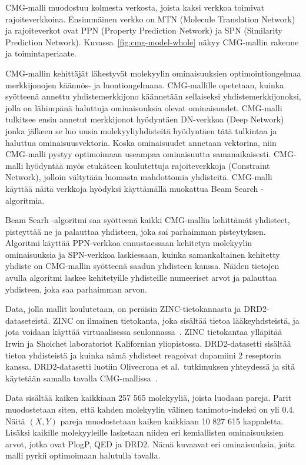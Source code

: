 \documentclass[finnish,twoside,censored,tkt,sw-line]{HYthesisML}
\begin{document}
CMG-malli muodostuu kolmesta verkosta, joista kaksi verkkoa toimivat rajoiteverkkoina.
Ensimmäinen verkko on MTN (Molecule Translation Network) ja rajoiteverkot ovat PPN (Property Prediction Network) ja SPN (Similarity Prediction Network).
Kuvassa~\ref{fig:cmg-model-whole} näkyy CMG-mallin rakenne ja toimintaperiaate.

CMG-mallin kehittäjät lähestyvät molekyylin ominaisuuksien optimointiongelmaa merkkijonojen käännös- ja luontiongelmana.
CMG-mallille opetetaan, kuinka syötteenä annettu yhdistemerkkijono käännetään sellaiseksi yhdistemerkkijonoksi, jolla on lähimpänä haluttuja ominaisuuksia olevat ominaisuudet.
CMG-malli tulkitsee ensin annetut merkkijonot hyödyntäen DN-verkkoa (Deep Network) jonka jälkeen se luo uusia molekyyliyhdisteitä hyödyntäen tätä tulkintaa ja haluttua ominaisuusvektoria.
Koska ominaisuudet annetaan vektorina, niin CMG-malli pystyy optimoimaan useampaa ominaisuutta samanaikaisesti.
CMG-malli hyödyntää myös etukäteen koulutettuja rajoiteverkkoja (Constraint Network), jolloin vältytään luomasta mahdottomia yhdisteitä.
CMG-malli käyttää näitä verkkoja hyödyksi käyttämällä muokattua Beam Search -algoritmia.

Beam Searh -algoritmi saa syötteenä kaikki CMG-mallin kehittämät yhdisteet, pisteyttää ne ja palauttaa yhdisteen, joka sai parhaimman pisteytyksen.
Algoritmi käyttää PPN-verkkoa ennustaessaan kehitetyn molekyylin ominaisuuksia ja SPN-verkkoa laskiessaan, kuinka samankaltainen kehitetty yhdiste on CMG-mallin syötteenä saadun yhdisteen kanssa.
Näiden tietojen avulla algoritmi laskee kehitetyille yhdisteille numeeriset arvot ja palauttaa yhdisteen, joka saa parhaimman arvon.

Data, jolla mallit koulutetaan, on peräisin ZINC-tietokannasta ja DRD2-dataseteistä.
ZINC on ilmainen tietokanta, joka sisältää tietoa lääkeyhdsteistä, ja jota voidaan käyttää virtuaalisessa seulonnassa~\cite{ZINC}.
ZINC tietokantaa ylläpitää Irwin ja Shoichet laboratoriot Kalifornian yliopistossa.
DRD2-datasetti sisältää tietoa yhdisteistä ja kuinka nämä yhdisteet reagoivat dopamiini 2 reseptorin kanssa.
DRD2-datasetti luotiin Olivecrona et al.\ tutkimuksen yhteydessä ja sitä käytetään samalla tavalla CMG-mallissa~\cite{ShinBonggun}.

Data sisältää kaiken kaikkiaan 257 565 molekyyliä, joista luodaan pareja.
Parit muodostetaan siten, että kahden molekyylin välinen tanimoto-indeksi on yli 0.4.
Näitä \((X,Y)\) pareja muodostetaan kaiken kaikkiaan 10 827 615 kappaletta.
Lisäksi kaikille molekyyleille lasketaan niiden eri kemiallisten ominaisuuksien arvot, jotka ovat PlogP, QED ja DRD2.
Nämä kuvaavat eri ominaisuuksia, joita malli pyrkii optimoimaan halutulla tavalla.
\end{document}
